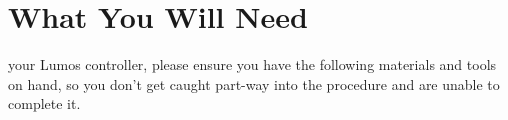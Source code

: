 \documentclass[letterpaper,twoside,onecolumn,openright,final]{memoir}
\begin{document}
%
%
%
%
%
\chapter{What You Will Need}\label{ch:materials}
 your Lumos controller, please ensure
you have the following materials and tools on hand, so you don't get caught part-way
into the procedure and are unable to complete it.
\end{document}
